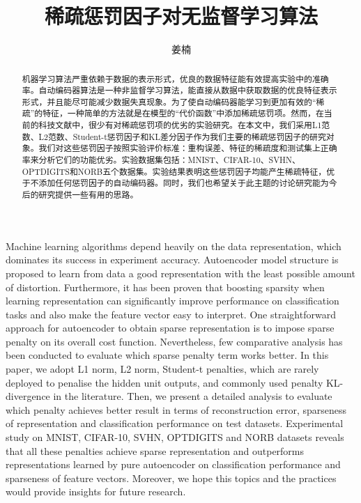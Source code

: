 \documentclass[oneside]{ZJUthesis}
\begin{document}
\songti
\title{稀疏惩罚因子对无监督学习算法}
\author{姜楠}
\makeCoverPage
\ZJUfrontmatter
\begin{abstract}
机器学习算法严重依赖于数据的表示形式，优良的数据特征能有效提高实验中的准确率。自动编码器算法是一种非监督学习算法，能直接从数据中获取数据的优良特征表示形式，并且能尽可能减少数据失真现象。为了使自动编码器能学习到更加有效的``稀疏''的特征，一种简单的方法就是在模型的``代价函数''中添加稀疏惩罚项。然而，在当前的科技文献中，很少有对稀疏惩罚项的优劣的实验研究。在本文中，我们采用L1范数、L2范数、Student-t惩罚因子和KL差分因子作为我们主要的稀疏惩罚因子的研究对象。我们对这些惩罚因子按照实验评价标准：重构误差、特征的稀疏度和测试集上正确率来分析它们的功能优劣。实验数据集包括：MNIST、CIFAR-10、SVHN、OPTDIGITS和NORB五个数据集。实验结果表明这些惩罚因子均能产生稀疏特征，优于不添加任何惩罚因子的自动编码器。同时，我们也希望关于此主题的讨论研究能为今后的研究提供一些有用的思路。


\end{abstract}

\begin{Eabstract}
Machine learning algorithms depend heavily on the data representation, which dominates its success in experiment accuracy. Autoencoder model structure is proposed to learn from data a good representation with the least possible amount of distortion. Furthermore, it has been proven that boosting sparsity when learning representation can significantly improve performance on classification tasks and also make the feature vector easy to interpret. One straightforward approach for autoencoder to obtain sparse representation is to impose sparse penalty on its overall cost function. Nevertheless, few comparative analysis has been conducted to evaluate which sparse penalty term works better. In this paper, we adopt L1 norm, L2 norm, Student-t penalties, which are rarely deployed to penalise the hidden unit outputs, and commonly used penalty KL-divergence in the literature. Then, we present a detailed analysis to evaluate which penalty achieves better result in terms of reconstruction error, sparseness of representation and classification performance on test datasets. Experimental study on MNIST, CIFAR-10, SVHN, OPTDIGITS and NORB datasets reveals that all these penalties achieve sparse representation and outperforms representations learned by pure autoencoder on classification performance and sparseness of feature vectors. Moreover, we hope this topics and the practices would provide insights for future research.




\end{Eabstract}
\ZJUcontents
\ZJUListofFigures
\ZJUListofTables
\end{document}
